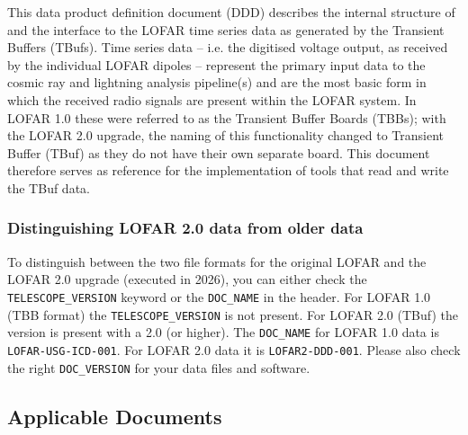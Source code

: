 \documentclass[a4paper,10pt,bibtotoc]{scrartcl}
\begin{document}
This data product definition document (DDD) describes the internal structure
of and the interface to the LOFAR time series data as generated by the Transient Buffers (TBufs). Time series data -- i.e. the digitised voltage output, as received by the individual LOFAR dipoles -- represent the primary input data to the cosmic ray and lightning analysis pipeline(s) and are the most basic form in which the received radio signals are present within the LOFAR
system. In LOFAR 1.0 these were referred to as the Transient Buffer Boards (TBBs); with the LOFAR 2.0 upgrade, the naming of this functionality changed to Transient Buffer (TBuf) as they do not have their own separate board. This document therefore serves as reference for the implementation of tools that read and write the TBuf data.

\subsubsection{Distinguishing LOFAR 2.0 data from older data}
To distinguish between the two file formats for the original LOFAR and the LOFAR 2.0 upgrade (executed in 2026), you can either check the \texttt{TELESCOPE\_VERSION} keyword or the \texttt{DOC\_NAME} in the header. For LOFAR 1.0 (TBB format) the \texttt{TELESCOPE\_VERSION} is not present. For LOFAR 2.0 (TBuf) the version is present with a  2.0 (or higher). The \texttt{DOC\_NAME} for LOFAR 1.0 data is \texttt{LOFAR-USG-ICD-001}. For LOFAR 2.0 data it is \texttt{LOFAR2-DDD-001}. Please also check the right \texttt{DOC\_VERSION} for your data files and software. %



\subsection{Applicable Documents}

\end{document}
